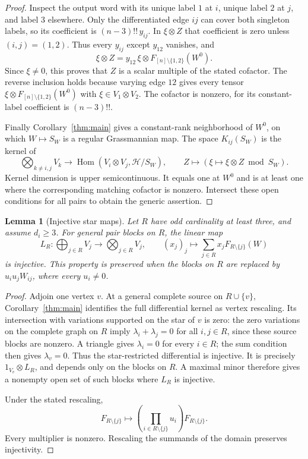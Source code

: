 \documentclass[11pt]{article}
\newtheorem{lemma}[theorem]{Lemma}
\theoremstyle{remark}\newtheorem{remark}[theorem]{Remark}
\begin{document}
\begin{proof}
Inspect the output word with its unique label $1$ at $i$, unique
label $2$ at $j$, and label $3$ elsewhere. Only the differentiated
edge $ij$ can cover both singleton labels, so its coefficient is
$(n-3)!!\,y_{ij}$. In $\xi\otimes Z$ that coefficient is zero unless
$(i,j)=(1,2)$. Thus every $y_{ij}$ except $y_{12}$ vanishes, and
\[
 \xi\otimes Z
 =y_{12}\, \xi\otimes F_{[n]\setminus\{1,2\}}(W^0).
\]
Since $\xi\ne0$, this proves that $Z$ is a scalar multiple of the
stated cofactor. The reverse inclusion holds because varying edge $12$
gives every tensor $\xi\otimes F_{[n]\setminus\{1,2\}}(W^0)$ with
$\xi\in V_1\otimes V_2$. The cofactor is nonzero, for its
constant-label coefficient is $(n-3)!!$.

Finally Corollary~\ref{thm:main} gives a constant-rank neighborhood of $W^0$,
on which $W\mapsto S_W$ is a regular Grassmannian map. The space
$K_{ij}(S_W)$ is the kernel of
\[
 \bigotimes_{k\ne i,j}V_k\longrightarrow
 \operatorname{Hom}(V_i\otimes V_j,\mathcal H/S_W),
 \qquad Z\longmapsto(\xi\mapsto \xi\otimes Z\bmod S_W).
\]
Kernel dimension is upper semicontinuous. It equals one at $W^0$ and
is at least one where the corresponding matching cofactor is nonzero.
Intersect these open conditions for all pairs to obtain the generic
assertion.
\end{proof}

\begin{lemma}[Injective star maps]\label{lem:generic-star}
Let $R$ have odd cardinality at least three, and assume $d_i\geq3$.
For general pair blocks on $R$, the linear map
\[
 L_R:\bigoplus_{j\in R}V_j\longrightarrow\bigotimes_{j\in R}V_j,
 \qquad (x_j)_j\longmapsto\sum_{j\in R}x_jF_{R\setminus\{j\}}(W)
\]
is injective. This property is preserved when the blocks on $R$ are
replaced by $u_i u_jW_{ij}$, where every $u_i\ne0$.
\end{lemma}
\begin{proof}
Adjoin one vertex $v$. At a general complete source on $R\cup\{v\}$,
Corollary~\ref{thm:main} identifies the full differential kernel as vertex rescaling. Its
intersection with variations supported on the star of $v$ is zero:
the zero variations on the complete graph on $R$ imply
$\lambda_i+\lambda_j=0$ for all $i,j\in R$, since these source blocks
are nonzero. A triangle gives $\lambda_i=0$ for every $i\in R$;
the sum condition then gives $\lambda_v=0$. Thus the star-restricted
differential is injective. It is precisely $1_{V_v}\otimes L_R$,
and depends only on the blocks on $R$. A maximal minor therefore
gives a nonempty open set of such blocks where $L_R$ is injective.

Under the stated rescaling,
\[
 F_{R\setminus\{j\}}\longmapsto
 \left(\prod_{i\in R\setminus\{j\}}u_i\right)
 F_{R\setminus\{j\}}.
\]
Every multiplier is nonzero. Rescaling the summands of the domain
preserves injectivity.
\end{proof}
\end{document}
